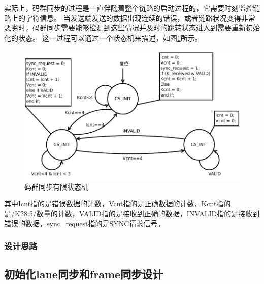 \documentclass[UTF8]{ctexart}
\begin{document}
实际上，码群同步的过程是一直伴随着整个链路的启动过程的，它需要时刻监控链路上的字符信息。
当发送端发送的数据出现连续的错误，或者链路状况变得非常恶劣时，码群同步需要能够检测到这些情况并及时的跳转状态进入到需要重新初始化的状态。
这一过程可以通过一个状态机来描述，如图\ref{fig:cgs_fsm}所示。

\begin{figure}[H]
\centering
\includegraphics[width=18cm]{./img/cgs_fsm.pdf}
\caption{码群同步有限状态机}
\label{fig:cgs_fsm}
\end{figure}

其中Icnt指的是错误数据的计数，Vcnt指的是正确数据的计数，Kcnt指的是/K28.5/数量的计数，VALID指的是接收到正确的数据，INVALID指的是接收到错误的数据，sync\_request指的是SYNC请求信号。

\subsubsection{设计思路}

\subsection{初始化lane同步和frame同步设计}


\end{document}

